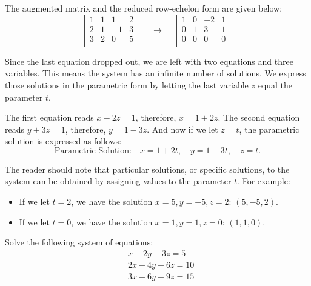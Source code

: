 \begin{solution}
    The augmented matrix and the reduced row-echelon form are given below:
    \[
        \left[\begin{array}{ccc|c}
                1 & 1 & 1  & 2 \\
                2 & 1 & -1 & 3 \\
                3 & 2 & 0  & 5 \\
            \end{array}
            \right]
        \quad\rightarrow\quad
        \left[\begin{array}{ccc|c}
                1 & 0 & -2 & 1 \\
                0 & 1 & 3  & 1 \\
                0 & 0 & 0  & 0 \\
            \end{array}
            \right]
    \]

    Since the last equation dropped out, we are left with two equations and three variables. This means the system has an infinite number of solutions. We express those solutions in the parametric form by letting the last variable \( z \) equal the parameter \( t \).

    The first equation reads \( x - 2z = 1 \), therefore, \( x = 1 + 2z \).
    The second equation reads \( y + 3z = 1 \), therefore, \( y = 1 - 3z \).
    And now if we let \( z = t \), the parametric solution is expressed as follows:
    \[ \text{Parametric Solution:} \quad x = 1 + 2t, \quad y = 1 - 3t, \quad z = t. \]

    The reader should note that particular solutions, or specific solutions, to the system can be obtained by assigning values to the parameter \( t \). For example:
    \begin{itemize}
        \item If we let \( t = 2 \), we have the solution \( x = 5, y = -5, z = 2 \): \( (5, -5, 2) \).
        \item If we let \( t = 0 \), we have the solution \( x = 1, y = 1, z = 0 \): \( (1, 1, 0) \).
    \end{itemize}
\end{solution}

\begin{example}
    Solve the following system of equations:
    \[
        \begin{aligned}
             & x + 2y - 3z = 5   \\
             & 2x + 4y - 6z = 10 \\
             & 3x + 6y - 9z = 15
        \end{aligned}
    \]
\end{example}

